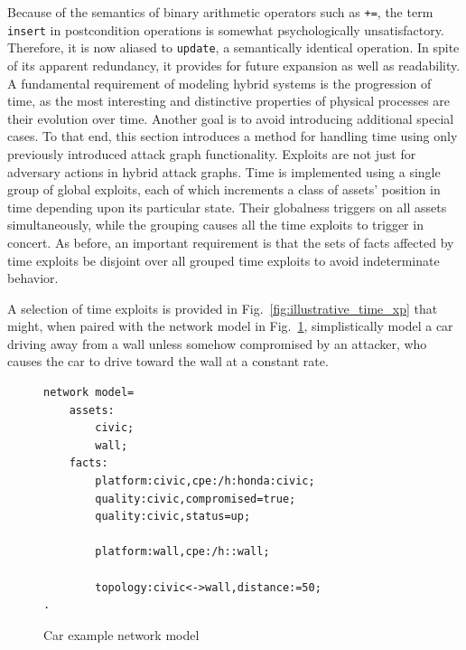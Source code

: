 Because of the semantics of binary arithmetic operators such as \texttt{+=},
the term \texttt{insert} in postcondition operations is somewhat psychologically
unsatisfactory. Therefore, it is now aliased to \texttt{update}, a semantically
identical operation. In spite of its apparent redundancy, it provides for
future expansion as well as readability.
A fundamental requirement of modeling hybrid systems is the progression of
time, as the most interesting and distinctive properties of physical processes
are their evolution over time. Another goal is to avoid introducing additional
special cases. To that end, this section introduces a method for handling time
using only previously introduced attack graph functionality.
Exploits are not just for adversary actions in hybrid attack graphs. Time is 
implemented using
a single group of global exploits, each of which increments a class of assets'
position in time depending upon its particular state. Their globalness
triggers on all assets simultaneously, while the grouping causes
all the time exploits to trigger in concert. As before,
an important requirement is that the sets of facts affected by time exploits
be disjoint over all grouped time exploits to avoid indeterminate behavior.

A selection of time exploits is provided in Fig.~\ref{fig:illustrative_time_xp}
that might, when paired with the network model in 
Fig.~\ref{fig:illustrative_time_nm}, simplistically model
a car driving away from a wall unless somehow compromised by an attacker,
who causes the car to drive toward the wall at a constant rate.

\begin{figure}
\begin{lstlisting}
network model=
    assets:
        civic;
        wall;
    facts:
        platform:civic,cpe:/h:honda:civic;
        quality:civic,compromised=true;
        quality:civic,status=up;

        platform:wall,cpe:/h::wall;

        topology:civic<->wall,distance:=50;
.
\end{lstlisting}
\caption{Car example network model}
\label{fig:illustrative_time_nm}
\end{figure}

